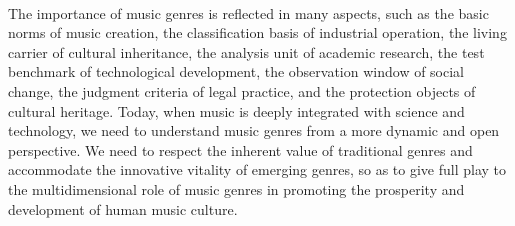 \\
The importance of music genres is reflected in many aspects, such as the basic norms of music creation, the classification basis of industrial operation, the living carrier of cultural inheritance, the analysis unit of academic research, the test benchmark of technological development, the observation window of social change, the judgment criteria of legal practice, and the protection objects of cultural heritage. Today, when music is deeply integrated with science and technology, we need to understand music genres from a more dynamic and open perspective. We need to respect the inherent value of traditional genres and accommodate the innovative vitality of emerging genres, so as to give full play to the multidimensional role of music genres in promoting the prosperity and development of human music culture. \\
\\

